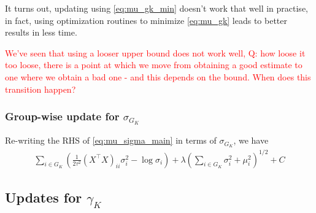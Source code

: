 \documentclass[12pt]{article}
\renewcommand{\red}[1]{\textcolor{red}{#1}}
\begin{document}
It turns out, updating using \eqref{eq:mu_gk_min} doesn't work that well in practise, in fact, using optimization routines to minimize \eqref{eq:mu_gk} leads to better results in less time.

\red{We've seen that using a looser upper bound does not work well, Q: how loose it too loose, there is a point at which we move from obtaining a good estimate to one where we obtain a bad one - and this depends on the bound. When does this transition happen?}

\subsubsection{Group-wise update for $\sigma_{G_K}$}

Re-writing the RHS of \eqref{eq:mu_sigma_main} in terms of $\sigma_{G_K}$, we have
\begin{equation} \label{eq:sig_gk}
\begin{aligned}
    \sum_{i \in G_K} \left( 
    \frac{1}{2\tau^2} 
	    (X^\top X)_{ii} \sigma_i^2
-
    \log{\sigma_i}
    \right )
+
    \lambda \left( \sum_{i \in G_K} 
	\sigma_i^2 + \mu_i^2
    \right)^{1/2} + C
\end{aligned}
\end{equation}

\subsection{Updates for $\gamma_K$}
\end{document}
